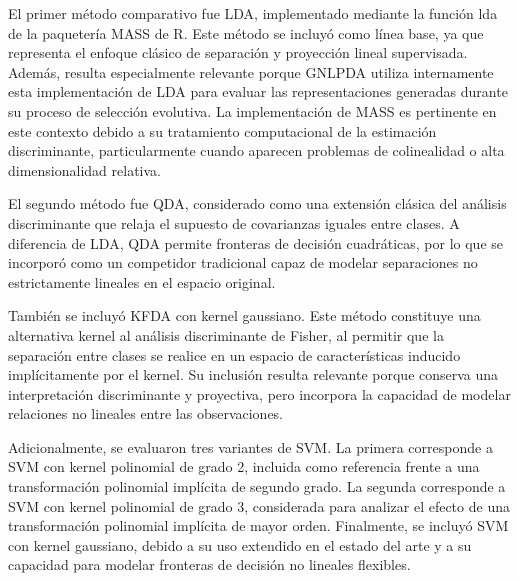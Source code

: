 El primer método comparativo fue LDA, implementado mediante la función lda de la paquetería MASS de R. Este método se incluyó como línea base, ya que representa el enfoque clásico de separación y proyección lineal supervisada. Además, resulta especialmente relevante porque GNLPDA utiliza internamente esta implementación de LDA para evaluar las representaciones generadas durante su proceso de selección evolutiva. La implementación de MASS es pertinente en este contexto debido a su tratamiento computacional de la estimación discriminante, particularmente cuando aparecen problemas de colinealidad o alta dimensionalidad relativa.

El segundo método fue QDA, considerado como una extensión clásica del análisis discriminante que relaja el supuesto de covarianzas iguales entre clases. A diferencia de LDA, QDA permite fronteras de decisión cuadráticas, por lo que se incorporó como un competidor tradicional capaz de modelar separaciones no estrictamente lineales en el espacio original.

También se incluyó KFDA con kernel gaussiano. Este método constituye una alternativa kernel al análisis discriminante de Fisher, al permitir que la separación entre clases se realice en un espacio de características inducido implícitamente por el kernel. Su inclusión resulta relevante porque conserva una interpretación discriminante y proyectiva, pero incorpora la capacidad de modelar relaciones no lineales entre las observaciones.

Adicionalmente, se evaluaron tres variantes de SVM. La primera corresponde a SVM con kernel polinomial de grado 2, incluida como referencia frente a una transformación polinomial implícita de segundo grado. La segunda corresponde a SVM con kernel polinomial de grado 3, considerada para analizar el efecto de una transformación polinomial implícita de mayor orden. Finalmente, se incluyó SVM con kernel gaussiano, debido a su uso extendido en el estado del arte y a su capacidad para modelar fronteras de decisión no lineales flexibles.

